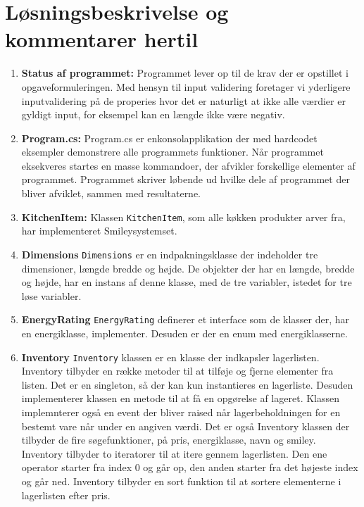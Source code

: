 \documentclass[11pt]{article}
\newcommand{\mono}{\texttt}
\begin{document}
\section{Løsningsbeskrivelse og kommentarer hertil}
\begin{enumerate}
	\item[] \textbf{Status af programmet:}
	Programmet lever op til de krav der er opstillet i opgaveformuleringen. Med hensyn til input validering foretager vi yderligere inputvalidering på de properies hvor det er naturligt at ikke alle værdier er gyldigt input, for eksempel kan en længde ikke være negativ. 
	\item[] \textbf{Program.cs:}
	Program.cs er enkonsolapplikation der med hardcodet eksempler demonstrere alle programmets funktioner. Når programmet eksekveres startes en masse kommandoer, der afvikler forskellige elementer af programmet. Programmet skriver løbende ud hvilke dele af programmet der bliver afviklet, sammen med resultaterne. 
			
	\item[] \textbf{KitchenItem:} Klassen \mono{KitchenItem}, som alle køkken produkter arver fra, har implementeret Smileysystemset.
		
	\item[] \textbf{Dimensions} \mono{Dimensions} er en indpakningsklasse der indeholder tre dimensioner, længde bredde og højde. De objekter der har en længde, bredde og højde, har en instans af denne klasse, med de tre variabler, istedet for tre løse variabler.  
	
	\item[] \textbf{EnergyRating} \mono{EnergyRating} definerer et interface som de klasser der, har en energiklasse, implementer. Desuden er der en enum med energiklasserne. 	
	
	\item[] \textbf{Inventory} \mono{Inventory} klassen er en klasse der indkapsler lagerlisten. Inventory tilbyder en række metoder til at tilføje og fjerne elementer fra listen. Det er en singleton, så der kan kun instantieres en lagerliste. Desuden implementerer klassen en metode til at få en opgørelse af lageret. Klassen implemnterer også en event der bliver raised når lagerbeholdningen for en bestemt vare når under en angiven værdi. Det er også Inventory klassen der tilbyder de fire søgefunktioner, på pris, energiklasse, navn og smiley. Inventory tilbyder to iteratorer til at itere gennem lagerlisten. Den ene operator starter fra index 0 og går op, den anden starter fra det højeste index og går ned. Inventory tilbyder en sort funktion til at sortere elementerne i lagerlisten efter pris.
	

\end{enumerate}
\end{document}

